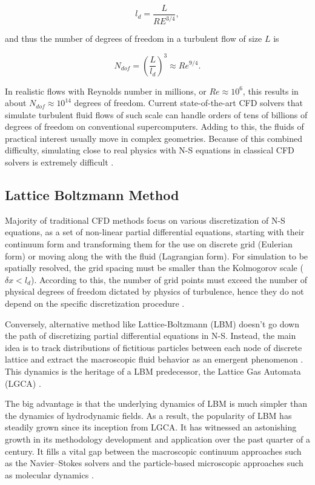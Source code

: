 \begin{equation}
	l_d = \frac{L}{RE^{3/4}},
\end{equation}

and thus the number of degrees of freedom in a turbulent flow of size $L$ is

\begin{equation}
	N_{dof} = \left(\frac{L}{l_d}\right)^3 \approx Re^{9/4}.
\end{equation}

In realistic flows with Reynolds number in millions, or $Re \approx 10^6$, this results in about $N_{dof} \approx 10^{14}$ degrees of freedom. Current state-of-the-art CFD solvers that simulate turbulent fluid flows of such scale can handle orders of tens of billions of degrees of freedom on conventional supercomputers. Adding to this, the fluids of practical interest usually move in complex geometries. Because of this combined difficulty, simulating close to real physics with N-S equations in classical CFD solvers is extremely difficult \citep{succi2018}.

\subsection{Lattice Boltzmann Method}
Majority of traditional CFD methods focus on various discretization of N-S equations, as a set of non-linear partial differential equations, starting with their continuum form and transforming them for the use on discrete grid (Eulerian form) or moving along the with the fluid (Lagrangian form). For simulation to be spatially resolved, the grid spacing must be smaller than the Kolmogorov scale ($\delta x < l_d$). According to this, the number of grid points must exceed the number of physical degrees of freedom dictated by physics of turbulence, hence they do not depend on the specific discretization procedure \citep{succi2018}.

Conversely, alternative method like Lattice-Boltzmann (LBM) doesn't go down the path of discretizing partial differential equations in N-S. Instead, the main idea is to track distributions of fictitious particles between each node of discrete lattice and extract the macroscopic fluid behavior as an emergent phenomenon \citep{succi2018}. This dynamics is the heritage of a LBM predecessor, the Lattice Gas Automata (LGCA) \citep{Hardy1973, frischLatticeGasAutomataNavierStokes1986}.

The big advantage is that the underlying dynamics of LBM is much simpler than the dynamics of hydrodynamic fields. As a result, the popularity of LBM has steadily grown since its inception from LGCA. It has witnessed an astonishing growth in its methodology development and application over the past quarter of a century. It fills a vital gap between the macroscopic continuum approaches such as the Navier–Stokes solvers and the particle-based microscopic approaches such as molecular dynamics \citep{liLatticeBoltzmannMethods2016a}.

